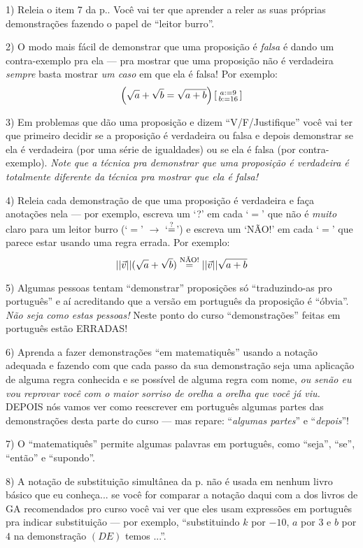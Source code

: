 \documentclass[oneside]{book}
\begin{document}
1) Releia o item 7 da p.\pageref{dicas}. Você vai ter que aprender
a reler as suas próprias demonstrações fazendo o papel de ``leitor
burro''.

2) O modo mais fácil de demonstrar que uma proposição é {\sl falsa} é
dando um contra-exemplo pra ela --- pra mostrar que uma proposição não
é verdadeira {\sl sempre} basta mostrar {\sl um caso} em que ela é
falsa! Por exemplo:
%
$$\left(\sqrt{a}+\sqrt{b} = \sqrt{a+b}\right) \subst{a:=9\\b:=16}$$

3) Em problemas que dão uma proposição e dizem ``V/F/Justifique'' você
vai ter que primeiro decidir se a proposição é verdadeira ou falsa e
depois demonstrar se ela é verdadeira (por uma série de igualdades) ou
se ela é falsa (por contra-exemplo). {\sl Note que a técnica pra
  demonstrar que uma proposição é verdadeira é totalmente diferente da
  técnica pra mostrar que ela é falsa!}

4) Releia cada demonstração de que uma proposição é verdadeira e faça
anotações nela --- por exemplo, escreva um `?' em cada `$=$' que não é
{\sl muito} claro para um leitor burro (`$=$' $→$ `$\eqq$') e escreva
um `NÃO!' em cada `$=$' que parece estar usando uma regra errada. Por
exemplo:
%
$$||\vv||(\sqrt{a}+\sqrt{b}) \eqN ||\vv||\sqrt{a+b}$$

5) Algumas pessoas tentam ``demonstrar'' proposições só
``traduzindo-as pro português'' e aí acreditando que a versão em
português da proposição é ``óbvia''. {\sl Não seja como estas
  pessoas!} Neste ponto do curso ``demonstrações'' feitas em português
estão ERRADAS!

6) Aprenda a fazer demonstrações ``em matematiquês'' usando a notação
adequada e fazendo com que cada passo da sua demonstração seja uma
aplicação de alguma regra conhecida e se possível de alguma regra com
nome, {\sl ou senão eu vou reprovar você com o maior sorriso de orelha
  a orelha que você já viu.} DEPOIS nós vamos ver como reescrever em
português algumas partes das demonstrações desta parte do curso ---
mas repare: ``{\sl algumas partes}'' e ``{\sl depois}''!

7) O ``matematiquês'' permite algumas palavras em português, como
``seja'', ``se'', ``então'' e ``supondo''.

8) A notação de substituição simultânea da p.\pageref{substituicao}
não é usada em nenhum livro básico que eu conheça... se você for
comparar a notação daqui com a dos livros de GA recomendados pro curso
você vai ver que eles usam expressões em português pra indicar
substituição --- por exemplo, ``substituindo $k$ por $-10$, $a$ por
$3$ e $b$ por $4$ na demonstração $(DE)$ temos ...''.
\end{document}
